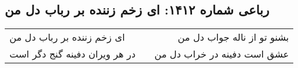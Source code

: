 \begin{center}
\section*{رباعی شماره ۱۴۱۲: ای زخم زننده بر رباب دل من}
\label{sec:1412}
\begin{longtable}{l p{0.5cm} r}
ای زخم زننده بر رباب دل من
&&
بشنو تو از ناله جواب دل من
\\
در هر ویران دفینه گنج دگر است
&&
عشق است دفینه در خراب دل من
\\
\end{longtable}
\end{center}
